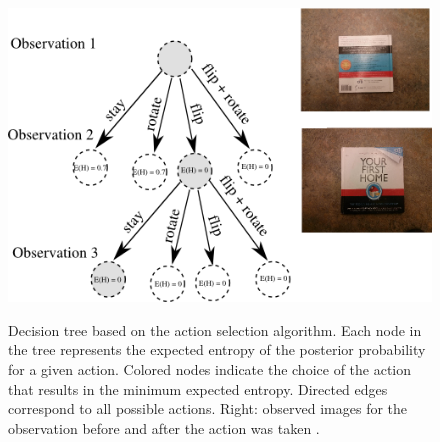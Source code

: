         
    \begin{figure}
    		\includegraphics[width = \columnwidth]{pics/tree_small2.png}
    	\label{fig:tree}
    	\caption{Decision tree based on the action selection algorithm. Each node in the tree represents the expected entropy of the posterior probability for a given action. Colored nodes indicate the choice of the action that results in the minimum expected entropy. Directed edges correspond to all possible actions. Right: observed images for the observation before and after the action was taken . }
    \end{figure}
    
